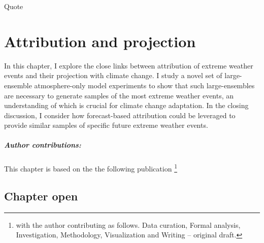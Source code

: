 \begin{savequote}[8cm]
    Quote
\end{savequote}
    
\chapter{\label{ch2}Attribution and projection} 

In this chapter, I explore the close links between attribution of extreme weather events and their projection with climate change. I study a novel set of large-ensemble atmosphere-only model experiments to show that such large-ensembles are necessary to generate samples of the most extreme weather events, an understanding of which is crucial for climate change adaptation. In the closing discussion, I consider how forecast-based attribution could be leveraged to provide similar samples of specific future extreme weather events.
\small\paragraph{Author contributions:} This chapter is based on the the following publication \footnote{with the author contributing as follows. Data curation, Formal analysis, Investigation, Methodology, Visualization and Writing -- original draft.} \par\vspace{1em}

\clearpage

\minitoc

\clearpage

\section{Chapter open}


